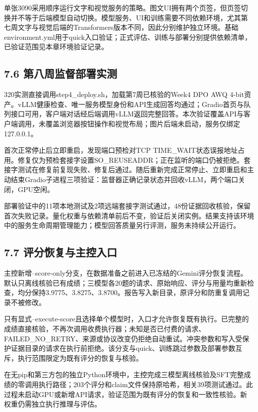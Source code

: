 \documentclass[UTF8,fontset=fandol,a4paper,11pt]{ctexart}
\begin{document}
单张3090采用顺序运行文字和视觉服务的策略。图文UI拥有两个页签，但页签切换并不等于后端模型自动切换。模型服务、UI和训练需要不同依赖环境，尤其第七周文字与视觉后端的Transformers版本不同，因此分别维护独立环境。基础environment.yml用于quick入口验证；正式评估、训练与部署分别提供依赖清单，已验证范围见本章环境验证记录。

\subsection{7.6 第八周监督部署实测}\label{ux7b2cux516bux5468ux76d1ux7763ux90e8ux7f72ux5b9eux6d4b}

320实测直接调用step4\_deploy.sh，加载第7周已核验的Week4 DPO AWQ
4-bit资产。vLLM健康检查、唯一服务模型身份和API生成回答均通过；Gradio首页与队列接口可用，客户端对话经后端调用vLLM返回完整回答。本次验证覆盖API与客户端调用，未覆盖浏览器按钮操作和视觉布局；图片后端未启动，服务仅绑定127.0.0.1。

首次正常停止后立即重启，发现端口预检对TCP
TIME\_WAIT状态误报地址占用。修复仅为预检套接字设置SO\_REUSEADDR；正在监听的端口仍被拒绝。套接字测试在修复前复现失败、修复后通过。随后重新完成正常停止、立即重启和主动结束Gradio子进程三项验证：监督器正确记录状态并回收vLLM，两个端口关闭，GPU空闲。

部署验证中的11项本地测试及2项远端套接字测试通过，48份证据回收核验，保留首次失败记录。量化权重与依赖清单前后不变，验证后关闭实例。结果支持该环境中的服务生命周期管理能力；模型回答质量另行评测，服务未持续公开运行。

\subsection{7.7 评分恢复与主控入口}\label{ux8bc4ux5206ux6062ux590dux4e0eux4e3bux63a7ux5165ux53e3}

主控新增--score-only分支，在数据准备之前进入已冻结的Gemini评分恢复流程。默认只离线核验已有成绩；三模型各20题的请求、原始响应、评分与用量均重新检查，均分保持3.9775、3.8275、3.8700。报告写入新目录，原评分和防重复调用记录不被修改。

只有显式--execute-score且选择单个模型时，入口才允许恢复既有执行。已完整的成绩直接核验，不再次调用收费执行器；未知是否已付费的请求、FAILED\_NO\_RETRY、来源或协议改变仍拒绝自动重试。冲突参数和写入受保护证据目录的请求在执行前拒绝。该分支与quick、训练跳过参数及部署参数互斥，执行范围限定为既有评分的恢复与核验。

在无pip和第三方包的独立Python环境中，主控完成三模型离线核验及SFT完整成绩的零调用执行路径；203个评分和claim文件保持原哈希，相关39项测试通过。此过程未启动GPU或新增API请求，验证范围为既有评分的恢复和一致性核验。新权重仍需独立执行推理与评估。
\end{document}
